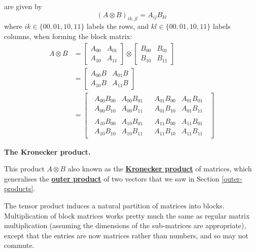 \documentclass[fleqn,a4paper]{article}
\newenvironment{technical}[1]{\textbf{#1.}\par\vspace{.5\baselineskip}\everypar{\setlength{\parindent}{1.5em}}}{}
\theoremstyle{definition}
\theoremstyle{definition}
\theoremstyle{definition}
\theoremstyle{definition}
\theoremstyle{remark}
\begin{document}
are given by
\[
  (A\otimes B)_{ik,jl} = A_{ij}B_{kl}
\]
where \(ik\in\{00,01,10,11\}\) labels the rows, and \(kl\in\{00,01,10,11\}\) labels columns, when forming the block matrix:
\[
  \begin{aligned}
    A\otimes B
    &= \begin{bmatrix}A_{00}&A_{01}\\A_{10}&A_{11}\end{bmatrix} \otimes \begin{bmatrix}B_{00}&B_{01}\\B_{10}&B_{11}\end{bmatrix}
  \\&= \begin{bmatrix}A_{00}B&A_{01}B\\A_{10}B&A_{11}B\end{bmatrix}
  \\&=
  \left[
  \,
    \begin{array}{c|c}
      \begin{matrix}A_{00}B_{00}&A_{00}B_{01}\\A_{00}B_{10}&A_{00}B_{11}\end{matrix}
      & \begin{matrix}A_{01}B_{00}&A_{01}B_{01}\\A_{01}B_{10}&A_{01}B_{11}\end{matrix}
    \\\hline
    \begin{matrix}A_{10}B_{00}&A_{10}B_{01}\\A_{10}B_{10}&A_{10}B_{11}\end{matrix}
      & \begin{matrix}A_{11}B_{00}&A_{11}B_{01}\\A_{11}B_{10}&A_{11}B_{11}\end{matrix}
    \end{array}
  \,
  \right]
  \end{aligned}
\]

\begin{technical}{The Kronecker product}
This product \(A\otimes B\) also known as the \href{https://en.wikipedia.org/wiki/Kronecker_product}{\textbf{Kronecker product}} of matrices, which generalises the \href{https://en.wikipedia.org/wiki/Outer_product}{\textbf{outer product}} of two vectors that we saw in Section \ref{outer-products}.

\end{technical}

The tensor product induces a natural partition of matrices into blocks.
Multiplication of block matrices works pretty much the same as regular matrix multiplication (assuming the dimensions of the sub-matrices are appropriate), except that the entries are now matrices rather than numbers, and so may not commute.
\end{document}
